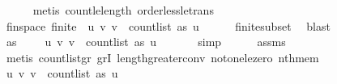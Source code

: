 \begin{isabellebody}
\ \ \ \ \isamarkupfalse%
\ {\isacharparenleft}{\kern0pt}metis\ count{\isacharunderscore}{\kern0pt}le{\isacharunderscore}{\kern0pt}length\ order{\isacharunderscore}{\kern0pt}less{\isacharunderscore}{\kern0pt}le{\isacharunderscore}{\kern0pt}trans{\isacharparenright}{\kern0pt}\isanewline
\isanewline
\ \ \isamarkupfalse%
\ fin{\isacharunderscore}{\kern0pt}space{\isacharcolon}{\kern0pt}\ {\isachardoublequoteopen}finite\ \ {\isacharbraceleft}{\kern0pt}{\isacharparenleft}{\kern0pt}u{\isacharcomma}{\kern0pt}\ v{\isacharparenright}{\kern0pt}{\isachardot}{\kern0pt}\ v\ {\isacharless}{\kern0pt}\ count{\isacharunderscore}{\kern0pt}list\ as\ u{\isacharbraceright}{\kern0pt}{\isachardoublequoteclose}\isanewline
\ \ \ \ \isamarkupfalse%
\ finite{\isacharunderscore}{\kern0pt}subset\ \isamarkupfalse%
\ blast\isanewline
\isanewline
\ \ \isamarkupfalse%
\ {\isachardoublequoteopen}{\isacharparenleft}{\kern0pt}as\ {\isacharbang}{\kern0pt}\ {}{\isacharcomma}{\kern0pt}\ {}{\isacharparenright}{\kern0pt}\ {\isasymin}\ {\isacharbraceleft}{\kern0pt}{\isacharparenleft}{\kern0pt}u{\isacharcomma}{\kern0pt}\ v{\isacharparenright}{\kern0pt}{\isachardot}{\kern0pt}\ v\ {\isacharless}{\kern0pt}\ count{\isacharunderscore}{\kern0pt}list\ as\ u{\isacharbraceright}{\kern0pt}{\isachardoublequoteclose}\ \isanewline
\ \ \ \ \isamarkupfalse%
\ {\isacharparenleft}{\kern0pt}simp{\isacharparenright}{\kern0pt}\isanewline
\ \ \ \ \isamarkupfalse%
\ assms{\isacharparenleft}{\kern0pt}{}{\isacharparenright}{\kern0pt}\ \isanewline
\ \ \ \ \isamarkupfalse%
\ {\isacharparenleft}{\kern0pt}metis\ count{\isacharunderscore}{\kern0pt}list{\isacharunderscore}{\kern0pt}gr{\isacharunderscore}{\kern0pt}{}\ gr{}I\ length{\isacharunderscore}{\kern0pt}greater{\isacharunderscore}{\kern0pt}{}{\isacharunderscore}{\kern0pt}conv\ not{\isacharunderscore}{\kern0pt}one{\isacharunderscore}{\kern0pt}le{\isacharunderscore}{\kern0pt}zero\ nth{\isacharunderscore}{\kern0pt}mem{\isacharparenright}{\kern0pt}\isanewline
\ \ \isamarkupfalse%
\ {\isachardoublequoteopen}{\isacharbraceleft}{\kern0pt}{\isacharparenleft}{\kern0pt}u{\isacharcomma}{\kern0pt}\ v{\isacharparenright}{\kern0pt}{\isachardot}{\kern0pt}\ v\ {\isacharless}{\kern0pt}\ count{\isacharunderscore}{\kern0pt}list\ as\ u{\isacharbraceright}{\kern0pt}\ {\isasymnoteq}\ {\isacharbraceleft}{\kern0pt}{\isacharbraceright}{\kern0pt}{\isachardoublequoteclose}\ \isamarkupfalse%

\end{isabellebody}
